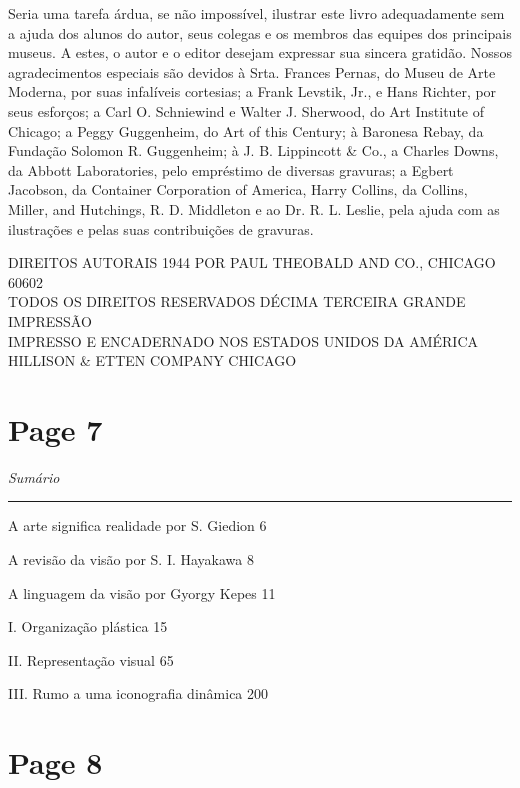 \documentclass[a4paper]{article}
\begin{document}
Seria uma tarefa árdua, se não impossível, ilustrar este livro adequadamente sem a ajuda dos alunos do autor, seus colegas e os membros das equipes dos principais museus. A estes, o autor e o editor desejam expressar sua sincera gratidão. Nossos agradecimentos especiais são devidos à Srta. Frances Pernas, do Museu de Arte Moderna, por suas infalíveis cortesias; a Frank Levstik, Jr., e Hans Richter, por seus esforços; a Carl O. Schniewind e Walter J. Sherwood, do Art Institute of Chicago; a Peggy Guggenheim, do Art of this Century; à Baronesa Rebay, da Fundação Solomon R. Guggenheim; à J. B. Lippincott \& Co., a Charles Downs, da Abbott Laboratories, pelo empréstimo de diversas gravuras; a Egbert Jacobson, da Container Corporation of America, Harry Collins, da Collins, Miller, and Hutchings, R. D. Middleton e ao Dr. R. L. Leslie, pela ajuda com as ilustrações e pelas suas contribuições de gravuras.

\vspace{2em}
\footnotesize
DIREITOS AUTORAIS 1944 POR PAUL THEOBALD AND CO., CHICAGO 60602 \\
TODOS OS DIREITOS RESERVADOS \hfill DÉCIMA TERCEIRA GRANDE IMPRESSÃO \\
IMPRESSO E ENCADERNADO NOS ESTADOS UNIDOS DA AMÉRICA \\
HILLISON \& ETTEN COMPANY \hfill CHICAGO

\newpage
\section*{Page 7}

\noindent\textit{Sumário}\par
\medskip
\hrule
\medskip
\noindent A arte significa realidade por S. Giedion \hfill 6\par
\noindent A revisão da visão por S. I. Hayakawa \hfill 8\par
\noindent A linguagem da visão por Gyorgy Kepes \hfill 11\par
\noindent \quad I. Organização plástica \hfill 15\par
\noindent \quad II. Representação visual \hfill 65\par
\noindent \quad III. Rumo a uma iconografia dinâmica \hfill 200\par

\newpage
\section*{Page 8}
\end{document}
